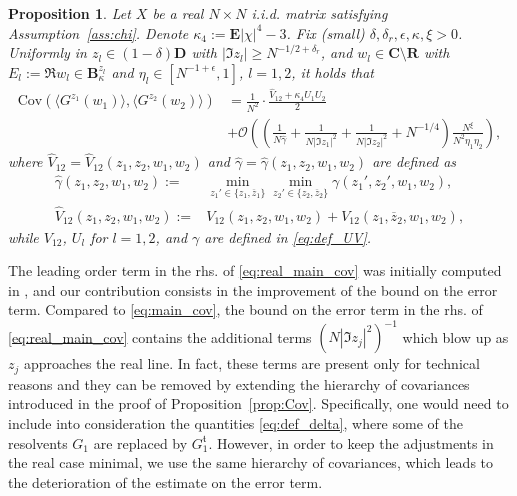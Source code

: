 \documentclass[10pt]{amsart}
\newtheorem{proposition}[theorem]{Proposition}
\numberwithin{equation}{section}
\newcommand{\E}{\mathbf{E}}
\newcommand{\R}{\mathbf{R}}
\newcommand{\C}{\mathbf{C}}
\newcommand{\Cov}{\mathrm{Cov}}
\newcommand{\mt}{\mathfrak{t}}
\begin{document}
\begin{proposition}\label{prop:real_Cov} Let $X$ be a real $N\times N$ i.i.d. matrix satisfying Assumption~\ref{ass:chi}. Denote $\kappa_4:=\E|\chi|^4-3$. Fix (small) $\delta,\delta_r, \epsilon, \kappa, \xi>0$. Uniformly in $z_l\in (1-\delta)\mathbf{D}$ with $|\Im z_l|\ge N^{-1/2+\delta_r}$, and $w_l\in\C\setminus\R$ with $E_l:=\Re w_l\in \mathbf{B}_\kappa^{z_l}$ and $\eta_l\in [N^{-1+\epsilon}, 1]$, $l=1,2$, it holds that
\begin{equation}
\begin{split}
\Cov \left(\langle G^{z_1}(w_1)\rangle,\langle G^{z_2}(w_2)\rangle\right) &= \frac{1}{N^2}\cdot \frac{\widehat{V}_{12}+\kappa_4U_1U_2}{2}\\
& + \mathcal{O}\left(\left(\frac{1}{N\widehat{\gamma}}+\frac{1}{N|\Im z_1|^2}+\frac{1}{N|\Im z_2|^2} +N^{-1/4}\right)\frac{N^\xi}{N^2\eta_1\eta_2}\right),
\end{split}
\label{eq:real_main_cov}
\end{equation}
where $\widehat{V}_{12}=\widehat{V}_{12}(z_1,z_2,w_1,w_2)$ and $\widehat{\gamma}=\widehat{\gamma}(z_1,z_2,w_1,w_2)$ are defined as
\begin{equation}
\begin{split}
\widehat{\gamma}(z_1,z_2,w_1,w_2):=&\min_{z_1'\in \{z_1,\overline{z}_1\}}\min_{z_2'\in\{z_2,\overline{z}_2\}} \gamma(z_1',z_2',w_1,w_2),\\
\widehat{V}_{12}(z_1,z_2,w_1,w_2):=&V_{12}(z_1,z_2,w_1,w_2)+V_{12}(z_1,\overline{z}_2,w_1,w_2),
\end{split}
\label{eq:real_def_UV}
\end{equation} 
while $V_{12}$, $U_l$ for $l=1,2$, and $\gamma$ are defined in \eqref{eq:def_UV}.
\end{proposition}

The leading order term in the rhs. of \eqref{eq:real_main_cov} was initially computed in \cite[Proposition~3.3]{macroCLT_real}, and our contribution consists in the improvement of the bound on the error term. Compared to \eqref{eq:main_cov}, the bound on the error term in the rhs. of \eqref{eq:real_main_cov} contains the additional terms $(N|\Im z_j|^2)^{-1}$ which blow up as $z_j$ approaches the real line. In fact, these terms are present only for technical reasons and they can be removed by extending the hierarchy of covariances introduced in the proof of Proposition~\ref{prop:Cov}. Specifically, one would need to include into consideration the quantities \eqref{eq:def_delta}, where some of the resolvents $G_1$ are replaced by $G_1^\mt$. However, in order to  keep the adjustments  in the real case  minimal, we use the same hierarchy of covariances, which leads to the deterioration of the estimate on the error term. 
\end{document}
